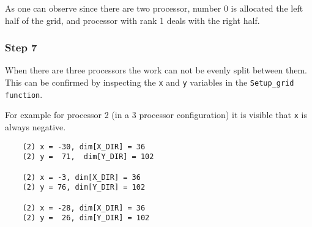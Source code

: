As one can observe since there are two processor, number 0 is allocated the left half of the grid, and processor with rank 1 deals with the right half.

\subsubsection{Step 7}




When there are three processors the work can not be evenly split between them. This can be confirmed by inspecting the \texttt{x} and \texttt{y} variables in the \texttt{Setup\_grid function}.

For example for processor 2 (in a 3 processor configuration) it is visible that \texttt{x} is always negative.

\begin{lstlisting}
    (2) x = -30, dim[X_DIR] = 36
    (2) y =  71,  dim[Y_DIR] = 102

    (2) x = -3, dim[X_DIR] = 36
    (2) y = 76, dim[Y_DIR] = 102

    (2) x = -28, dim[X_DIR] = 36
    (2) y =  26, dim[Y_DIR] = 102
\end{lstlisting}


